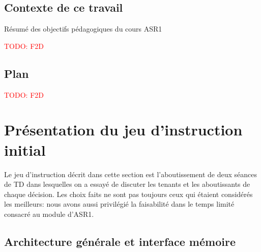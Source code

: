 \documentclass[architecture]{compas2018}
\newcommand{\todo}[1]{\textcolor{red}{TODO: #1}}
\begin{document}
\subsection{Contexte de ce travail}
Résumé des objectifs pédagogiques du cours ASR1

\todo{F2D}
\subsection{Plan}

\todo{F2D}


\section{Présentation du jeu d'instruction initial}
Le jeu d'instruction décrit dans cette section est l'aboutissement de deux séances de TD dans lesquelles on a essayé de discuter les tenants et les aboutissants de chaque décision.
Les choix faits ne sont pas toujours ceux qui étaient considérés les meilleurs: nous avons aussi privilégié la faisabilité dans le temps limité consacré au module d'ASR1.

\subsection{Architecture générale et interface mémoire}
\end{document}
